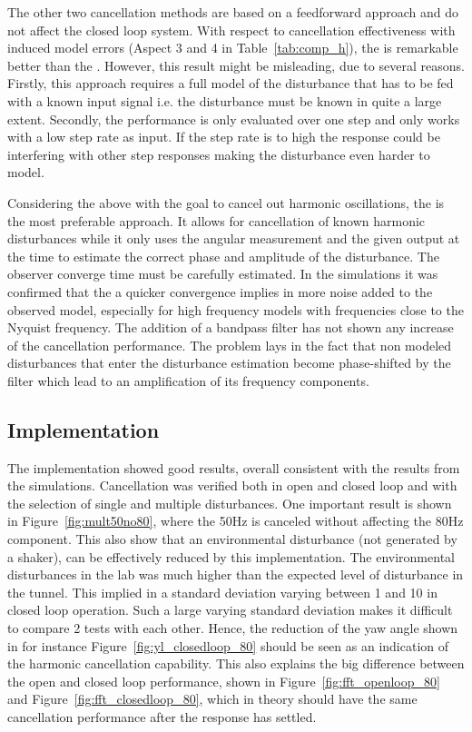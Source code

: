 The other two cancellation methods are based on a feedforward approach and do not affect the closed loop system. With respect to cancellation effectiveness with induced model errors (Aspect 3 and 4 in Table~\ref{tab:comp_h}), the \abbrFDC is remarkable better than the \abbrRFDC. However, this result might be misleading, due to several reasons. Firstly, this approach requires a full model of the disturbance that has to be fed with a known input signal i.e. the disturbance must be known in quite a large extent. Secondly, the \abbrFDC performance is only evaluated over one step and only works with a low step rate as input. If the step rate is to high the response could be interfering with other step responses making the disturbance even harder to model.

Considering the above with the goal to cancel out harmonic oscillations, the \abbrRFDC is the most preferable approach. It allows for cancellation of known harmonic disturbances while it only uses the angular measurement and the given output at the time to estimate the correct phase and amplitude of the disturbance. The observer converge time must be carefully estimated. In the simulations it was confirmed that the a quicker convergence implies in more noise added to the observed model, especially for high frequency models with frequencies close to the Nyquist frequency. The addition of a bandpass filter has not shown any increase of the cancellation performance. The problem lays in the fact that non modeled disturbances that enter the disturbance estimation become phase-shifted by the filter which lead to an amplification of its frequency components.

\subsection{Implementation}
The \abbrRFDC implementation showed good results, overall consistent with the results from the simulations. Cancellation was verified both in open and closed loop and with the selection of single and multiple disturbances. One important result is shown in Figure~\ref{fig:mult50no80}, where the 50Hz is canceled without affecting the 80Hz component. This also show that an environmental disturbance (not generated by a shaker), can be effectively reduced by this implementation. The environmental disturbances in the lab was much higher than the expected level of disturbance in the tunnel. This implied in a standard deviation varying between \unit{1}{\micro\radian} and \unit{10}{\micro\radian} in closed loop operation. Such a large varying standard deviation makes it difficult to compare 2 tests with each other. Hence, the reduction of the yaw angle shown in for instance Figure~\ref{fig:yl_closedloop_80} should be seen as an indication of the harmonic cancellation capability. This also explains the big difference between the open and closed loop performance, shown in Figure~\ref{fig:fft_openloop_80} and Figure~\ref{fig:fft_closedloop_80}, which in theory should have the same cancellation performance after the response has settled.

